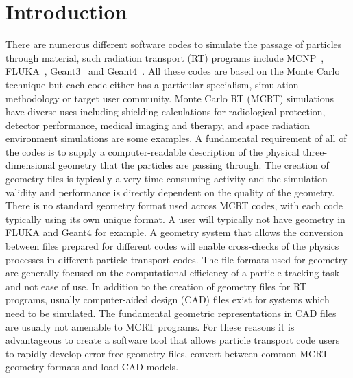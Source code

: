 \documentclass[final,5p,times,twocolumn]{elsarticle}
\begin{document}
\begin{small}

\end{small}

\section{Introduction} \label{sec:introduction}
There are numerous different software codes to simulate the passage of particles through material, such radiation transport (RT) programs 
include MCNP~\cite{Mcnp_Werner}, FLUKA~\cite{Fluka_Ferrari,Fluka_Bohlen}, Geant3~\cite{Geant3_Brun} and Geant4~\cite{Geant4_Agostinelli}. 
All these codes are based on the Monte Carlo technique but each code either has a particular specialism, simulation methodology or target user community.  
 Monte Carlo RT (MCRT) simulations have diverse uses including shielding calculations for radiological protection, detector performance, medical 
imaging and therapy, and space radiation environment simulations are some examples. A fundamental requirement of all of the codes is to supply a 
computer-readable description of the  physical three-dimensional geometry that  the particles are passing through.  The creation of geometry files is 
typically a very time-consuming activity and the simulation validity and performance is directly dependent on the quality of the geometry. There is no 
standard geometry format used across MCRT codes, with each code typically using its own unique format. A user will typically not have geometry in FLUKA and Geant4 for example. A geometry system 
that allows the conversion between files prepared for different codes will enable cross-checks of the physics processes in different particle transport
 codes.  The file formats used for geometry are generally focused 
 on the computational efficiency of a particle tracking task and not ease of use. In addition to the creation of geometry files for RT programs, usually 
 computer-aided design (CAD) files exist for systems which need to be simulated. The fundamental geometric representations in CAD files are usually not 
 amenable to MCRT programs.  For these reasons it is advantageous to create a software tool that allows particle transport code users to rapidly develop 
 error-free geometry files, convert between common MCRT geometry formats and load CAD models.
\end{document}
